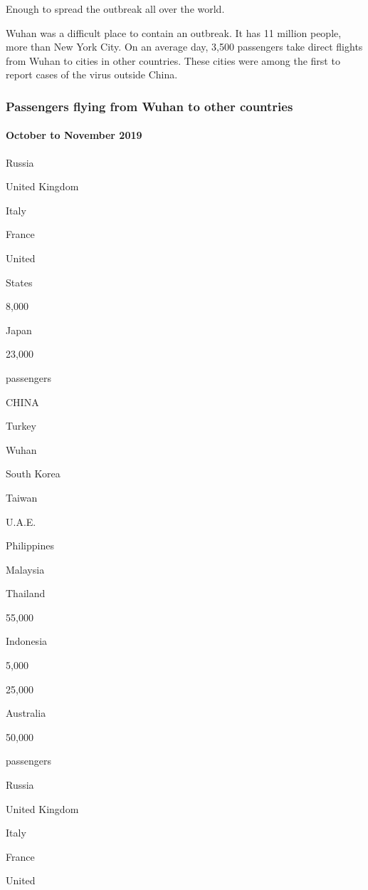 Enough to spread the outbreak all over the world.

Wuhan was a difficult place to contain an outbreak. It has 11 million
people, more than New York City. On an average day, 3,500 passengers
take direct flights from Wuhan to cities in other countries. These
cities were among the first to report cases of the virus outside China.

\hypertarget{passengers-flying-from-wuhan-to-other-countries}{%
\subsubsection{Passengers flying from Wuhan to other
countries}\label{passengers-flying-from-wuhan-to-other-countries}}

\hypertarget{october-to-november-2019}{%
\paragraph{October to November 2019}\label{october-to-november-2019}}

Russia

United Kingdom

Italy

France

United

States

8,000

Japan

23,000

passengers

CHINA

Turkey

Wuhan

South Korea

Taiwan

U.A.E.

Philippines

Malaysia

Thailand

55,000

Indonesia

5,000

25,000

Australia

50,000

passengers

Russia

United Kingdom

Italy

France

United

